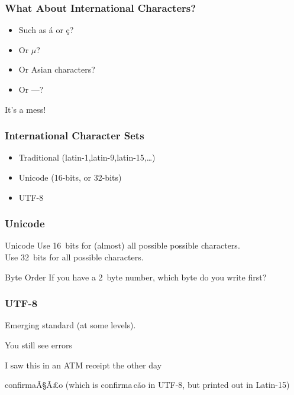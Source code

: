 \begin{frame}[fragile]
\frametitle{What About International Characters?}

\begin{itemize}
\item Such as \'{a} or \c{c}?
\item Or $\mu$?
\item Or Asian characters?
\item Or ---?

\end{itemize}
It's a mess!
\end{frame}

\begin{frame}[fragile]
\frametitle{International Character Sets}

\begin{itemize}
\item Traditional (latin-1,latin-9,latin-15,\ldots)
\item Unicode (16-bits, or 32-bits)
\item UTF-8
\end{itemize}
\end{frame}

\begin{frame}[fragile]
\frametitle{Unicode}

\begin{block}{Unicode}
Use 16~bits for (almost) all possible possible characters.\\
Use 32~bits for all possible characters.
\end{block}

\begin{block}{Byte Order}
If you have a 2~byte number, which byte do you write first?
\end{block}

\end{frame}

\begin{frame}[fragile]
\frametitle{UTF-8}
Emerging standard (at some levels).

\pause

You still see errors

I saw this in an ATM receipt the other day

confirmaÃ§Ã£o (which is confirma\,{c}\~{a}o in UTF-8, but printed out in Latin-15)

\end{frame}




